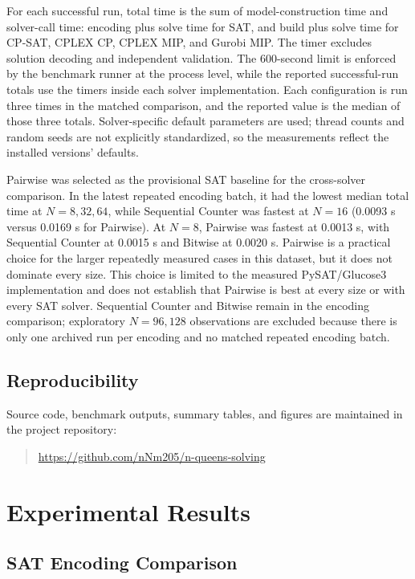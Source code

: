 \documentclass[a4paper,fleqn]{cas-sc}
\begin{document}
For each successful run, total time is the sum of model-construction time and solver-call time: encoding plus solve time for SAT, and build plus solve time for CP-SAT, CPLEX CP, CPLEX MIP, and Gurobi MIP. The timer excludes solution decoding and independent validation. The 600-second limit is enforced by the benchmark runner at the process level, while the reported successful-run totals use the timers inside each solver implementation. Each configuration is run three times in the matched comparison, and the reported value is the median of those three totals. Solver-specific default parameters are used; thread counts and random seeds are not explicitly standardized, so the measurements reflect the installed versions' defaults.

Pairwise was selected as the provisional SAT baseline for the cross-solver comparison. In the latest repeated encoding batch, it had the lowest median total time at $N=8,32,64$, while Sequential Counter was fastest at $N=16$ (0.0093 s versus 0.0169 s for Pairwise). At $N=8$, Pairwise was fastest at 0.0013 s, with Sequential Counter at 0.0015 s and Bitwise at 0.0020 s. Pairwise is a practical choice for the larger repeatedly measured cases in this dataset, but it does not dominate every size. This choice is limited to the measured PySAT/Glucose3 implementation and does not establish that Pairwise is best at every size or with every SAT solver. Sequential Counter and Bitwise remain in the encoding comparison; exploratory $N=96,128$ observations are excluded because there is only one archived run per encoding and no matched repeated encoding batch.

\subsection{Reproducibility}

Source code, benchmark outputs, summary tables, and figures are maintained in the project repository:
\begin{quote}
\url{https://github.com/nNm205/n-queens-solving}
\end{quote}

\section{Experimental Results}

\subsection{SAT Encoding Comparison}
\end{document}
